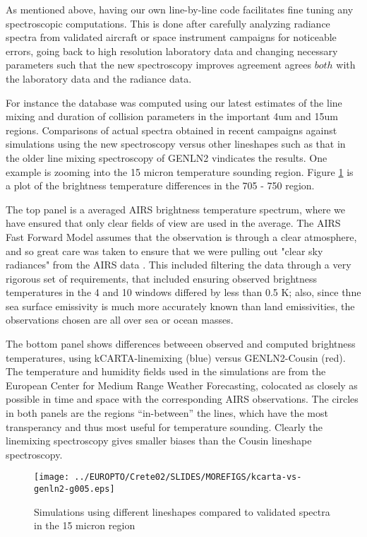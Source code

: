 \documentclass[11pt]{article}
\begin{document}
As mentioned above, having our own line-by-line code facilitates fine tuning 
any spectroscopic computations. This is done after carefully analyzing radiance
spectra from validated aircraft or space instrument campaigns for noticeable
errors, going back to high resolution laboratory data and changing necessary
parameters such that the new spectroscopy improves agreement agrees $both$ 
with the laboratory data and the radiance data.

For instance the \cd database was computed using our latest 
estimates of the line mixing and duration of collision parameters in the 
important 4um and 15um regions. Comparisons of actual spectra obtained in 
recent campaigns against simulations using the new \cd spectroscopy versus 
other \cd lineshapes such as that in the older line mixing spectroscopy of 
\textsf{GENLN2} vindicates the results. One example is zooming into the 
15 micron \cd temperature sounding region. Figure \ref{fig:15umcompare}
is a plot of the brightness temperature differences in the 705 - 750 \wn 
region. 

The top panel is a averaged AIRS brightness temperature spectrum, where
we have ensured that only clear fields of view are used in the average. 
The AIRS Fast Forward Model assumes that the observation is through a 
clear atmosphere, and so great care was taken to ensure that we were 
pulling out "clear sky radiances" from the AIRS data \cite{des:02*2}. 
This included filtering the data through a very rigorous set of 
requirements, that included ensuring observed brightness temperatures in 
the 4 and 10 \um windows differed by less than 0.5 K; also, since thne sea 
surface emissivity is much more accurately known than land emissivities, 
the observations chosen are all over sea or ocean masses. \cite{des:02*2}

The bottom panel shows differences betweeen observed and computed 
brightness temperatures, using kCARTA-linemixing (blue) versus 
GENLN2-Cousin (red). The temperature 
and humidity fields used in the simulations are from the European Center for
Medium Range Weather Forecasting, colocated as closely as possible in time and
space with the corresponding AIRS observations. The circles in both panels are
the regions ``in-between'' the lines, which have the most transperancy and thus
most useful for temperature sounding. Clearly the linemixing spectroscopy 
gives smaller biases than the Cousin lineshape spectroscopy. 

\begin{figure}
\texttt{[image: ../EUROPTO/Crete02/SLIDES/MOREFIGS/kcarta-vs-genln2-g005.eps]}
  \caption{Simulations using different lineshapes compared to validated 
           spectra in the 15 micron region}
  \label{fig:15umcompare} 
\end{figure} 
\end{document}
